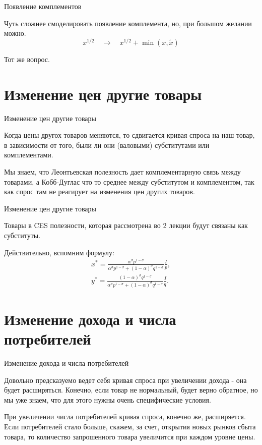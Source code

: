 \documentclass{beamer}
\begin{document}
\begin{frame}{Появление комплементов}

Чуть сложнее смоделировать появление комплемента, но, при большом желании можно.
$$ x^{1/2} \quad \to \quad x^{1/2} + \min(x, \tilde x)$$

Тот же вопрос.

\end{frame}

\section{Изменение цен другие товары}

\begin{frame}{Изменение цен другие товары}

Когда цены другох товаров меняются, то сдвигается кривая спроса на наш товар, в зависимости от того, были ли они (валовыми) субститутами или комплементами.

Мы знаем, что Леонтьевская полезность дает комплементарную связь между товарами, а Кобб-Дуглас что то среднее между субститутом и комплементом, так как спрос там не реагирует на изменения цен других товаров. 
	
\end{frame}

\begin{frame}{Изменение цен другие товары}

Товары в CES полезности, которая рассмотрена во 2 лекции будут связаны как субституты. 

Действительно, вспомним формулу:
\begin{gather*}
x^{\ast} = \frac{\alpha^{\sigma} p^{1-\sigma}}{\alpha^{\sigma} p^{1-\sigma} + (1-\alpha)^{\sigma} q^{1-\sigma}}\frac{I}{p},\\
y^{\ast} = \frac{(1-\alpha)^{\sigma} q^{1-\sigma}}{\alpha^{\sigma} p^{1-\sigma} + (1-\alpha)^{\sigma} q^{1-\sigma}}\frac{I}{q}.
\end{gather*}
	
\end{frame}

\section{Изменение дохода и числа потребителей}

\begin{frame}{Изменение дохода и числа потребителей}

Довольно предсказуемо ведет себя кривая спроса при увеличении дохода - она будет расширяться. Конечно, если товар не нормальный, будет верно обратное, но мы уже знаем, что для этого нужны очень специфические условия.

При увеличении числа потребителей кривая спроса, конечно же, расширяется. Если потребителей стало больше, скажем, за счет, открытия новых рынков сбыта товара, то количество запрошенного товара увеличится при каждом уровне цены.

\end{frame}
\end{document}
